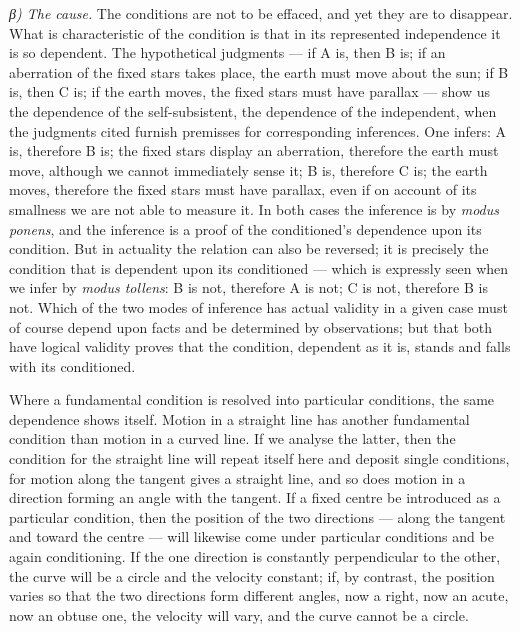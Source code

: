 \documentclass[12pt,a4paper]{book}
\newcommand{\subrunin}[1]{\emph{#1}\hspace{0.4em}}
\begin{document}
\subrunin{β) The cause.} The conditions are not to be effaced, and yet they are to disappear.
What is characteristic of the condition is that in its represented independence it is so
dependent. The hypothetical judgments --- if A is, then B is; if an aberration of the fixed
stars takes place, the earth must move about the sun; if B is, then C is; if the earth moves,
the fixed stars must have parallax --- show us the dependence of the self-subsistent, the
dependence of the independent, when the judgments cited furnish premisses for
corresponding inferences. One infers: A is, therefore B is; the fixed stars display an
aberration, therefore the earth must move, although we cannot immediately sense it; B is,
therefore C is; the earth moves, therefore the fixed stars must have parallax, even if on
account of its smallness we are not able to measure it. In both cases the inference is by
\textit{modus ponens}, and the inference is a proof of the conditioned's dependence upon its
condition. But in actuality the relation can also be reversed; it is precisely the condition
that is dependent upon its conditioned --- which is expressly seen when we infer by
\textit{modus tollens}: B is not, therefore A is not; C is not, therefore B is not. Which of
the two modes of inference has actual validity in a given case must of course depend upon
facts and be determined by observations; but that both have logical validity proves that the
condition, dependent as it is, stands and falls with its conditioned.

Where a fundamental condition is resolved into particular conditions,
the same dependence shows itself. Motion in a straight line has another fundamental condition
than motion in a curved line. If we analyse the latter, then the condition for the straight
line will repeat itself here and deposit single conditions, for motion along the tangent gives
a straight line, and so does motion in a direction forming an angle with the tangent. If a
fixed centre be introduced as a particular condition, then the position of the two directions
--- along the tangent and toward the centre --- will likewise come under particular conditions
and be again conditioning. If the one direction is constantly perpendicular to the other, the
curve will be a circle and the velocity constant; if, by contrast, the position varies so that
the two directions form different angles, now a right, now an acute, now an obtuse one, the
velocity will vary, and the curve cannot be a circle.
\end{document}
